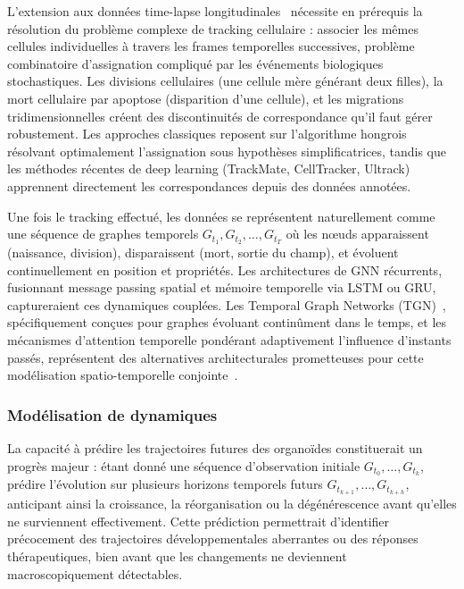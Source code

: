 L'extension aux données time-lapse longitudinales~\cite{Matthews2022} nécessite en prérequis la résolution du problème complexe de tracking cellulaire : associer les mêmes cellules individuelles à travers les frames temporelles successives, problème combinatoire d'assignation compliqué par les événements biologiques stochastiques. Les divisions cellulaires (une cellule mère générant deux filles), la mort cellulaire par apoptose (disparition d'une cellule), et les migrations tridimensionnelles créent des discontinuités de correspondance qu'il faut gérer robustement. Les approches classiques reposent sur l'algorithme hongrois résolvant optimalement l'assignation sous hypothèses simplificatrices, tandis que les méthodes récentes de deep learning (TrackMate, CellTracker, Ultrack) apprennent directement les correspondances depuis des données annotées.

Une fois le tracking effectué, les données se représentent naturellement comme une séquence de graphes temporels $G_{t_1}, G_{t_2}, \ldots, G_{t_T}$ où les nœuds apparaissent (naissance, division), disparaissent (mort, sortie du champ), et évoluent continuellement en position et propriétés. Les architectures de GNN récurrents, fusionnant message passing spatial et mémoire temporelle via LSTM ou GRU, captureraient ces dynamiques couplées. Les Temporal Graph Networks (TGN)~\cite{Rossi2020,Xu2020TGN}, spécifiquement conçues pour graphes évoluant continûment dans le temps, et les mécanismes d'attention temporelle pondérant adaptivement l'influence d'instants passés, représentent des alternatives architecturales prometteuses pour cette modélisation spatio-temporelle conjointe~\cite{Kazemi2020}.

\subsubsection{Modélisation de dynamiques}

La capacité à prédire les trajectoires futures des organoïdes constituerait un progrès majeur : étant donné une séquence d'observation initiale $G_{t_0}, \ldots, G_{t_k}$, prédire l'évolution sur plusieurs horizons temporels futurs $G_{t_{k+1}}, \ldots, G_{t_{k+h}}$, anticipant ainsi la croissance, la réorganisation ou la dégénérescence avant qu'elles ne surviennent effectivement. Cette prédiction permettrait d'identifier précocement des trajectoires développementales aberrantes ou des réponses thérapeutiques, bien avant que les changements ne deviennent macroscopiquement détectables.

